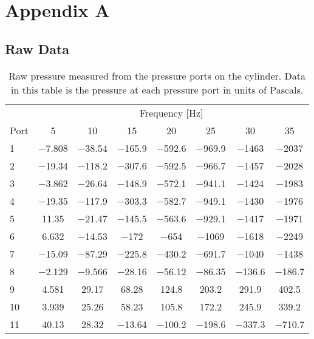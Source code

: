 \chapter{Appendix A}
\section{Raw Data}

\begin{table}[htpb]
    \caption{Raw pressure measured from the pressure ports on the cylinder. Data in this table is the pressure at each pressure port in units of Pascals.}
    \label{tab:raw_data}
    \centering
    \begin{tabular}{lccccccc}
        \toprule
        & \multicolumn{7}{c}{Frequency [\unit{\hertz}]} \\
        \cmidrule(lr){2-8}
        Port & 5 & 10 & 15 & 20 & 25 & 30 & 35 \\
        \midrule
		\num{1} & \num{-7.808} & \num{-38.54} & \num{-165.9} & \num{-592.6} & \num{-969.9} & \num{-1463} & \num{-2037} \\
		\num{2} & \num{-19.34} & \num{-118.2} & \num{-307.6} & \num{-592.5} & \num{-966.7} & \num{-1457} & \num{-2028} \\
		\num{3} & \num{-3.862} & \num{-26.64} & \num{-148.9} & \num{-572.1} & \num{-941.1} & \num{-1424} & \num{-1983} \\
		\num{4} & \num{-19.35} & \num{-117.9} & \num{-303.3} & \num{-582.7} & \num{-949.1} & \num{-1430} & \num{-1976} \\
		\num{5} & \num{11.35} & \num{-21.47} & \num{-145.5} & \num{-563.6} & \num{-929.1} & \num{-1417} & \num{-1971} \\
		\num{6} & \num{6.632} & \num{-14.53} & \num{-172} & \num{-654} & \num{-1069} & \num{-1618} & \num{-2249} \\
		\num{7} & \num{-15.09} & \num{-87.29} & \num{-225.8} & \num{-430.2} & \num{-691.7} & \num{-1040} & \num{-1438} \\
		\num{8} & \num{-2.129} & \num{-9.566} & \num{-28.16} & \num{-56.12} & \num{-86.35} & \num{-136.6} & \num{-186.7} \\
		\num{9} & \num{4.581} & \num{29.17} & \num{68.28} & \num{124.8} & \num{203.2} & \num{291.9} & \num{402.5} \\
		\num{10} & \num{3.939} & \num{25.26} & \num{58.23} & \num{105.8} & \num{172.2} & \num{245.9} & \num{339.2} \\
		\num{11} & \num{40.13} & \num{28.32} & \num{-13.64} & \num{-100.2} & \num{-198.6} & \num{-337.3} & \num{-710.7} \\

\end{tabular}
\end{table}
